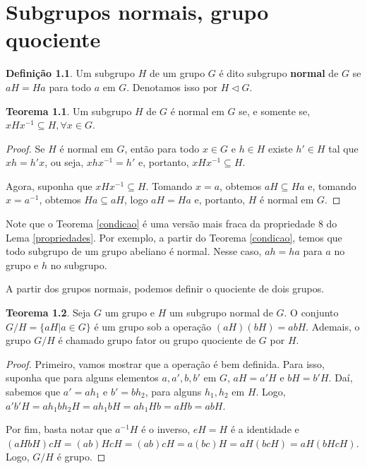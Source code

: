 \documentclass[a4paper,portuguese,11pt,twoside, leqno]{book}
\theoremstyle{definition}
\newtheorem{theorem}{Teorema}[section]
\newtheorem{deff}{Definição}[section]
\begin{document}
	
	
	\chapter{Subgrupos normais, grupo quociente}\label{capitulo subgrupos normais}
	
	\begin{deff}
		Um subgrupo $H$ de um grupo $G$ é dito subgrupo \textbf{normal} de $G$ se $aH = Ha$ para todo $a$ em $G$. Denotamos isso por $H\vartriangleleft G$.
	\end{deff}
	
	\begin{theorem}
		\label{condicao}
		Um subgrupo $H$ de $G$ é normal em $G$ se, e somente se, $xHx^{-1}\subseteq H, \forall x\in G$. 
	\end{theorem} 
	
	\begin{proof}
		Se $H$ é normal em $G$, então para todo $x\in G$ e $h\in H$ existe $h'\in H$ tal que $xh = h'x$, ou seja, $xhx^{-1} = h'$ e, portanto, $xHx^{-1}\subseteq H.$
		\par\vspace{0.3cm} Agora, suponha que $xHx^{-1}\subseteq H$. Tomando $x=a$, obtemos $aH\subseteq Ha$ e, tomando $x = a^{-1}$, obtemos $Ha\subseteq aH$, logo $aH = Ha$ e, portanto, $H$ é normal em $G$.
	\end{proof}
	\par\vspace{0.3cm} Note que o Teorema \eqref{condicao} é uma versão mais fraca da propriedade 8 do Lema \eqref{propriedades}. Por exemplo, a partir do Teorema \eqref{condicao}, temos que todo subgrupo de um grupo abeliano é normal. Nesse caso, $ah = ha$ para $a$ no grupo e $h$ no subgrupo. 
	\par\vspace{0.3cm} A partir dos grupos normais, podemos definir o quociente de dois grupos.
	
	\begin{theorem}
		\label{quociente}
		Seja $G$ um grupo e $H$ um subgrupo normal de $G$. O conjunto $G/H = \{ aH|a\in G \}$ é um grupo sob a operação $(aH)(bH) = abH$. Ademais, o grupo $G/H$ é chamado grupo fator ou grupo quociente de $G$ por $H$.
	\end{theorem}
	
	\begin{proof}
		Primeiro, vamos mostrar que a operação é bem definida. Para isso, suponha que para alguns elementos $a, a', b, b'$ em $G$, $aH = a'H$ e $bH = b'H$. Daí, sabemos que $a' = ah_1$ e $b' = bh_2$, para alguns $h_1, h_2$ em $H$. Logo, $a'b'H = ah_1bh_2H = ah_1bH = ah_1Hb = aHb = abH$. 
		\par\vspace{0.3cm} Por fim, basta notar que $a^{-1}H$ é o inverso, $eH = H$ é a identidade e $(aHbH)cH = (ab)HcH = (ab)cH = a(bc)H = aH(bcH) = aH(bHcH)$. Logo, $G/H$ é grupo.
	\end{proof}
	
\end{document}
